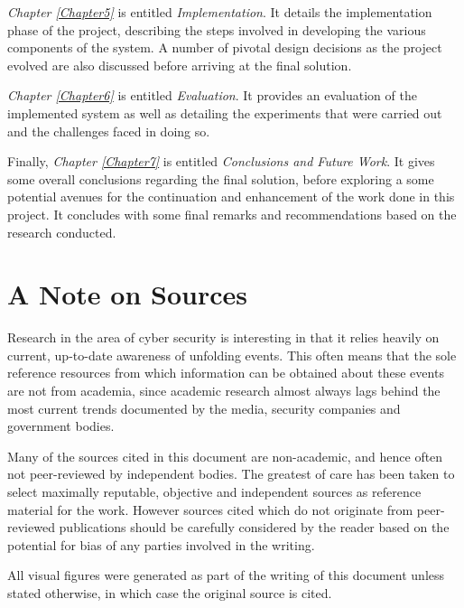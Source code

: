 \textit{Chapter \ref{Chapter5}} is entitled \textit{Implementation}. It details the implementation phase of the project, describing the steps involved in developing the various components of the system. A number of pivotal design decisions as the project evolved are also discussed before arriving at the final solution.

\textit{Chapter \ref{Chapter6}} is entitled \textit{Evaluation}. It provides an evaluation of the implemented system as well as detailing the experiments that were carried out and the challenges faced in doing so. 

Finally, \textit{Chapter \ref{Chapter7}} is entitled \textit{Conclusions and Future Work}. It gives some overall conclusions regarding the final solution, before exploring a some potential avenues for the continuation and enhancement of the work done in this project. It concludes with some final remarks and recommendations based on the research conducted.

\section{A Note on Sources} \label{NoteOnSources}
Research in the area of cyber security is interesting in that it relies heavily on current, up-to-date awareness of unfolding events. This often means that the sole reference resources from which information can be obtained about these events are not from academia, since academic research almost always lags behind the most current trends documented by the media, security companies and government bodies. 

Many of the sources cited in this document are non-academic, and hence often not peer-reviewed by independent bodies. The greatest of care has been taken to select maximally reputable, objective and independent sources as reference material for the work.  However sources cited which do not originate from peer-reviewed publications should be carefully considered by the reader based on the potential for bias of any parties involved in the writing.

All visual figures were generated as part of the writing of this document unless stated otherwise, in which case the original source is cited.

